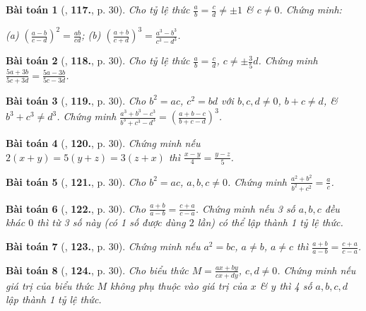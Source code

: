 \documentclass{article}
\newtheorem{baitoan}{Bài toán}
\begin{document}
\begin{baitoan}[\cite{Tuyen_Toan_7}, \textbf{117.}, p. 30]
	Cho tỷ lệ thức $\frac{a}{b} = \frac{c}{d}\ne\pm 1$ \& $c\ne 0$. Chứng minh:
	
		(a) $\left(\frac{a - b}{c - d}\right)^2 = \frac{ab}{cd}$;
		(b) $\left(\frac{a + b}{c + d}\right)^3 = \frac{a^3 - b^3}{c^3 - d^3}$.
	
\end{baitoan}

\begin{baitoan}[\cite{Tuyen_Toan_7}, \textbf{118.}, p. 30]
	Cho tỷ lệ thức $\frac{a}{b} = \frac{c}{d}$, $c\ne\pm\frac{3}{5}d$. Chứng minh $\frac{5a + 3b}{5c + 3d} = \frac{5a - 3b}{5c - 3d}$.
\end{baitoan}

\begin{baitoan}[\cite{Tuyen_Toan_7}, \textbf{119.}, p. 30]
	Cho $b^2 = ac$, $c^2 = bd$ với $b,c,d\ne 0$, $b + c\ne d$, \& $b^3 + c^3\ne d^3$. Chứng minh $\frac{a^3 + b^3 - c^3}{b^3 + c^3 - d^3} = \left(\frac{a + b - c}{b + c - d}\right)^3$.
\end{baitoan}

\begin{baitoan}[\cite{Tuyen_Toan_7}, \textbf{120.}, p. 30]
	Chứng minh nếu $2(x + y) = 5(y + z) = 3(z + x)$ thì $\frac{x - y}{4} = \frac{y - z}{5}$.
\end{baitoan}

\begin{baitoan}[\cite{Tuyen_Toan_7}, \textbf{121.}, p. 30]
	Cho $b^2 = ac$, $a,b,c\ne 0$. Chứng minh $\frac{a^2 + b^2}{b^2 + c^2} = \frac{a}{c}$.
\end{baitoan}

\begin{baitoan}[\cite{Tuyen_Toan_7}, \textbf{122.}, p. 30]
	Cho $\frac{a + b}{a - b} = \frac{c + a}{c - a}$. Chứng minh nếu 3 số $a,b,c$ đều khác $0$ thì từ 3 số này (có 1 số được dùng $2$ lần) có thể lập thành 1 tỷ lệ thức.
\end{baitoan}

\begin{baitoan}[\cite{Tuyen_Toan_7}, \textbf{123.}, p. 30]
	Chứng minh nếu $a^2 = bc$, $a\ne b$, $a\ne c$ thì $\frac{a + b}{a - b} = \frac{c + a}{c - a}$.
\end{baitoan}

\begin{baitoan}[\cite{Tuyen_Toan_7}, \textbf{124.}, p. 30]
	Cho biểu thức $M = \frac{ax + by}{cx + dy}$, $c,d\ne 0$. Chứng minh nếu giá trị của biểu thức $M$ không phụ thuộc vào giá trị của $x$ \& $y$ thì 4 số $a,b,c,d$ lập thành 1 tỷ lệ thức.
\end{baitoan}
\end{document}
